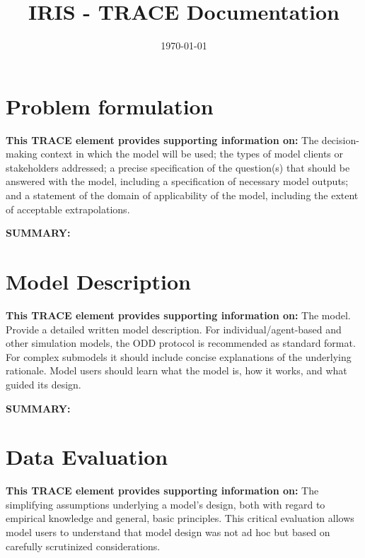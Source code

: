 \documentclass[a4paper, 11pt, parskip = full]{scrartcl}
\title{IRIS - TRACE Documentation}
\author{}
\date{\today}
\begin{document}
\maketitle
\tableofcontents


\section{Problem formulation}
\textbf{This TRACE element provides supporting information on:} The decision-making context in which the model will
be used; the types of model clients or stakeholders addressed; a precise specification of the question(s) that should be
answered with the model, including a specification of necessary model outputs; and a statement of the domain of
applicability of the model, including the extent of acceptable extrapolations.

\textbf{SUMMARY:}
\begin{addmargin}[3em]{2em}
\textbf{

}
\end{addmargin}



\clearpage
\section{Model Description}
\textbf{This TRACE element provides supporting information on:} The model. Provide a detailed written model
description. For individual/agent-based and other simulation models, the ODD protocol is recommended as standard format. For complex
submodels it should include concise explanations of the underlying rationale. Model users should learn what the model
is, how it works, and what guided its design.

\textbf{SUMMARY:}
\begin{addmargin}[3em]{2em}
	\textbf{

	}
\end{addmargin}



\clearpage
\section{Data Evaluation}
\textbf{This TRACE element provides supporting information on:} The simplifying assumptions underlying a model's
design, both with regard to empirical knowledge and general, basic principles. This critical evaluation allows model users to
understand that model design was not ad hoc but based on carefully scrutinized considerations.
\end{document}
